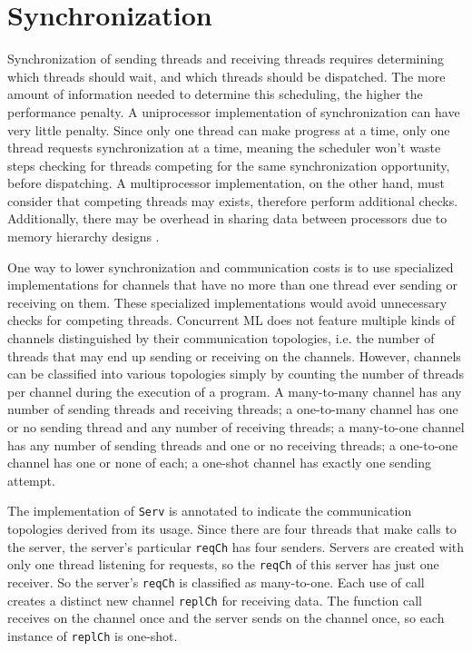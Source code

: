 \documentclass{article}
\begin{document}
\section{Synchronization}
Synchronization of sending threads and receiving threads
requires determining which threads should wait, and which threads should be dispatched.
The more amount of information needed
to determine this scheduling, the higher the performance penalty. A uniprocessor
implementation of synchronization can have very little penalty. Since only one thread can make
progress at a time, only one thread requests synchronization at a time, meaning the scheduler
won't waste steps checking for threads competing for the same synchronization opportunity,
before dispatching. A multiprocessor implementation, on the other hand, must consider that
competing threads may exists, therefore perform additional checks. Additionally, there may be 
overhead in sharing data between processors due to memory hierarchy designs \cite{}. 

One way to lower synchronization and communication costs is to use specialized implementations
for channels that have no more than one thread ever sending or receiving on them.  These
specialized implementations would avoid unnecessary checks for competing threads.
Concurrent ML does not feature multiple kinds of channels distinguished by their communication
topologies, i.e. the number of threads that may end up sending or receiving on the channels.
However, channels can be classified into various topologies simply by counting the number of
threads per channel during the execution of a program.  A many-to-many channel has any number
of sending threads and receiving threads;
a one-to-many channel has one or no sending thread and
any number of receiving threads;
a many-to-one channel has any number of sending threads and one or
no receiving threads; a one-to-one channel has one or none of each;
a one-shot channel has
exactly one sending attempt.

The implementation of \lstinline{Serv} is annotated to indicate the communication topologies
derived from its usage. Since there are four threads that make calls to the server, the
server's particular \lstinline{reqCh} has four senders.  Servers are created with only one
thread listening for requests, so the \lstinline{reqCh} of this server has just one receiver.
So the server's \lstinline{reqCh} is classified as many-to-one.
Each use of call creates a distinct
new channel \lstinline{replCh} for receiving data.  The function call receives on the channel
once and the server sends on the channel once, so each instance of \lstinline{replCh} is
one-shot.
\end{document}
